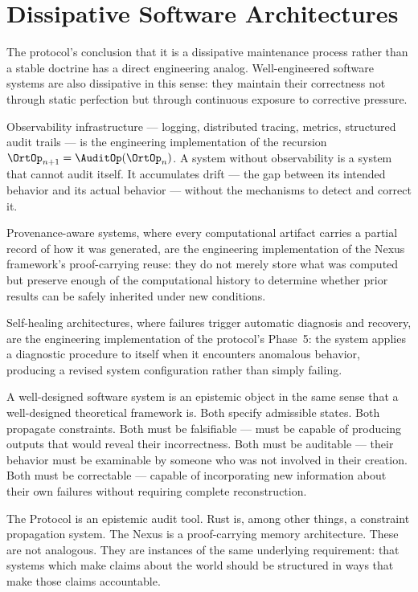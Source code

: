 \section{Dissipative Software Architectures}
\label{sec:dissipative-software}

The protocol's conclusion that it is a dissipative
maintenance process rather than a stable doctrine
has a direct engineering analog. Well-engineered software
systems are also dissipative in this sense: they
maintain their correctness not through static perfection
but through continuous exposure to corrective pressure.

Observability infrastructure --- logging, distributed
tracing, metrics, structured audit trails --- is the
engineering implementation of the \Ortyx{} recursion
$\OrtOp_{n+1} = \AuditOp(\OrtOp_n)$. A system without
observability is a system that cannot audit itself.
It accumulates drift --- the gap between its intended
behavior and its actual behavior --- without the
mechanisms to detect and correct it.

Provenance-aware systems, where every computational
artifact carries a partial record of how it was generated,
are the engineering implementation of the Nexus
framework's proof-carrying reuse: they do not merely
store what was computed but preserve enough of the
computational history to determine whether prior results
can be safely inherited under new conditions.

Self-healing architectures, where failures trigger
automatic diagnosis and recovery, are the engineering
implementation of the protocol's Phase~5: the system
applies a diagnostic procedure to itself when it
encounters anomalous behavior, producing a revised
system configuration rather than simply failing.

\begin{interlude}
  A well-designed software system is an epistemic
  object in the same sense that a well-designed
  theoretical framework is. Both specify admissible
  states. Both propagate constraints. Both must be
  falsifiable --- must be capable of producing outputs
  that would reveal their incorrectness. Both must
  be auditable --- their behavior must be examinable
  by someone who was not involved in their creation.
  Both must be correctable --- capable of incorporating
  new information about their own failures without
  requiring complete reconstruction.

  The \Ortyx{} Protocol is an epistemic audit tool.
  Rust is, among other things, a constraint propagation
  system. The Nexus is a proof-carrying memory architecture.
  These are not analogous. They are instances of the
  same underlying requirement: that systems which
  make claims about the world should be structured
  in ways that make those claims accountable.
\end{interlude}

